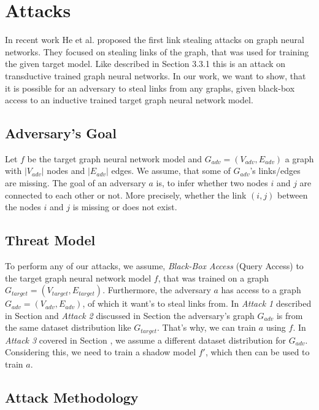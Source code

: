 \chapter{Attacks}

  In recent work He et al. \cite{DBLP:journals/corr/abs-2005-02131} proposed the first link stealing attacks on graph neural networks.
  They focused on stealing links of the graph, that was used for training the given target model.
  Like described in Section 3.3.1 this is an attack on transductive trained graph neural networks.
  In our work, we want to show, that it is possible for an adversary to steal links from any graphs, given black-box access to an inductive trained target graph neural network model.

  \section{Adversary's Goal}

    Let $f$ be the target graph neural network model and $G_{adv} = (V_{adv}, E_{adv})$ a graph with $|V_{adv}|$ nodes and $|E_{adv}|$ edges. 
    We assume, that some of $G_{adv}$'s links/edges are missing.
    The goal of an adversary $a$ is, to infer whether two nodes $i$ and $j$ are connected to each other or not.
    More precisely, whether the link $(i,j)$ between the nodes $i$ and $j$ is missing or does not exist.
  
  \section{Threat Model}

    To perform any of our attacks, we assume, \emph{Black-Box Access} (Query Access) to the target graph neural network model $f$, that was trained on a graph $G_{target} = (V_{target}, E_{target})$.
    Furthermore, the adversary $a$ has access to a graph $G_{adv} = (V_{adv}, E_{adv})$, of which it want's to steal links from. 
    In \emph{Attack 1} described in Section  and \emph{Attack 2} discussed in Section  the adversary's graph $G_{adv}$ is from the same dataset distribution like $G_{target}$. 
    That's why, we can train $a$ using $f$.
    In \emph{Attack 3} covered in Section , we assume a different dataset distribution for $G_{adv}$.
    Considering this, we need to train a shadow model $f'$, which then can be used to train $a$.

  \section{Attack Methodology}

